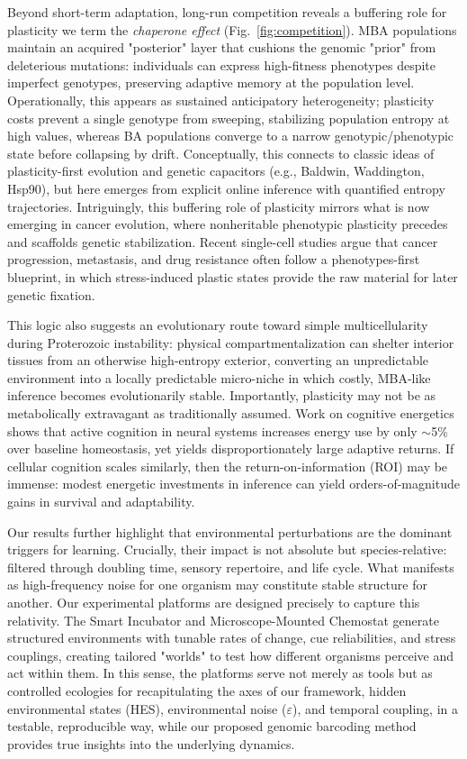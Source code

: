 \documentclass[aps,pre,twocolumn,floatfix,nofootinbib,amsmath,amssymb]{revtex4-2}
\begin{document}
Beyond short-term adaptation, long-run competition reveals a buffering role for plasticity we term the \emph{chaperone effect} (Fig.~\ref{fig:competition}). MBA populations maintain an acquired "posterior" layer that cushions the genomic "prior" from deleterious mutations: individuals can express high-fitness phenotypes despite imperfect genotypes, preserving adaptive memory at the population level. Operationally, this appears as sustained anticipatory heterogeneity; plasticity costs prevent a single genotype from sweeping, stabilizing population entropy at high values, whereas BA populations converge to a narrow genotypic/phenotypic state before collapsing by drift. Conceptually, this connects to classic ideas of plasticity-first evolution and genetic capacitors (e.g., Baldwin, Waddington, Hsp90), but here emerges from explicit online inference with quantified entropy trajectories. Intriguingly, this buffering role of plasticity mirrors what is now emerging in cancer evolution, where nonheritable phenotypic plasticity precedes and scaffolds genetic stabilization. Recent single-cell studies argue that cancer progression, metastasis, and drug resistance often follow a phenotypes-first blueprint, in which stress-induced plastic states provide the raw material for later genetic fixation\citep{frank_origin_2024}.

This logic also suggests an evolutionary route toward simple multicellularity during Proterozoic instability: physical compartmentalization can shelter interior tissues from an otherwise high-entropy exterior, converting an unpredictable environment into a locally predictable micro-niche in which costly, MBA-like inference becomes evolutionarily stable. Importantly, plasticity may not be as metabolically extravagant as traditionally assumed. Work on cognitive energetics shows that active cognition in neural systems increases energy use by only $\sim$5\% over baseline homeostasis, yet yields disproportionately large adaptive returns. If cellular cognition scales similarly, then the return-on-information (ROI) may be immense: modest energetic investments in inference can yield orders-of-magnitude gains in survival and adaptability\citep{jamadar_metabolic_2025}.

Our results further highlight that environmental perturbations are the dominant triggers for learning. Crucially, their impact is not absolute but species-relative: filtered through doubling time, sensory repertoire, and life cycle. What manifests as high-frequency noise for one organism may constitute stable structure for another. Our experimental platforms are designed precisely to capture this relativity. The Smart Incubator and Microscope-Mounted Chemostat generate structured environments with tunable rates of change, cue reliabilities, and stress couplings, creating tailored "worlds" to test how different organisms perceive and act within them. In this sense, the platforms serve not merely as tools but as controlled ecologies for recapitulating the axes of our framework, hidden environmental states (HES), environmental noise ($\varepsilon$), and temporal coupling, in a testable, reproducible way, while our proposed genomic barcoding method provides true insights into the underlying dynamics. 
\end{document}

